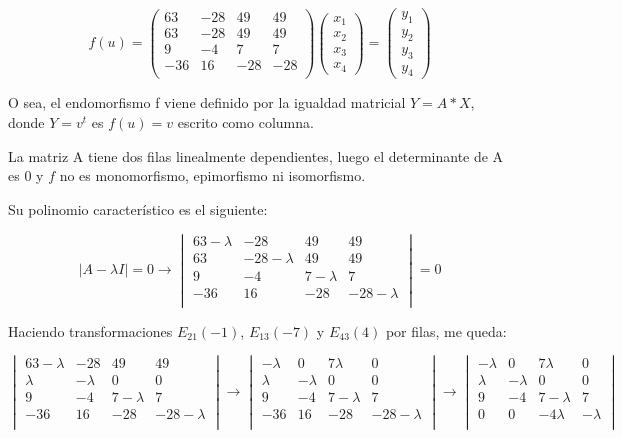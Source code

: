 \documentclass[11pt, a4paper]{article}
\newif\IfInSansMode
\theoremstyle{theorem-style}
\theoremstyle{definition-style}
\theoremstyle{remark-style}
\theoremstyle{example-style}
\begin{document}
$$f(u) = \begin{pmatrix}
63 & -28 & 49 & 49\\
63 & -28 & 49 & 49\\
9 & -4 & 7 & 7\\
-36 & 16 & -28 & -28 \\
\end{pmatrix}\begin{pmatrix}
x_1\\
x_2\\
x_3\\
x_4
\end{pmatrix}=
\begin{pmatrix}
y_1\\
y_2\\
y_3\\
y_4
\end{pmatrix}$$

O sea, el endomorfismo f viene definido por la igualdad matricial $Y=A*X$, donde $Y=v^{t}$ es $f(u)=v$ escrito como columna.

La matriz A tiene dos filas linealmente dependientes, luego el determinante de A es 0 y $f$ no es monomorfismo, epimorfismo ni isomorfismo.

Su polinomio característico es el siguiente:

$$|A-\lambda I| = 0 \rightarrow 
\begin{vmatrix}
63-\lambda & -28 & 49 & 49\\
63 & -28-\lambda & 49 & 49\\
9 & -4 & 7-\lambda & 7\\
-36 & 16 & -28 & -28-\lambda \\
\end{vmatrix} = 0 $$

Haciendo transformaciones $E_{21}(-1)$, $E_{13}(-7)$ y $E_{43}(4)$ por filas, me queda:

$$\begin{vmatrix}
63-\lambda & -28 & 49 & 49\\
\lambda & -\lambda & 0 & 0\\
9 & -4 & 7-\lambda & 7\\
-36 & 16 & -28 & -28-\lambda \\
\end{vmatrix} \rightarrow 
\begin{vmatrix}
-\lambda & 0 & 7\lambda & 0\\
\lambda & -\lambda & 0 & 0\\
9 & -4 & 7-\lambda & 7\\
-36 & 16 & -28 & -28-\lambda \\ 
\end{vmatrix} \rightarrow 
\begin{vmatrix}
-\lambda & 0 & 7\lambda & 0\\
\lambda & -\lambda & 0 & 0\\
9 & -4 & 7-\lambda & 7\\
0 & 0 & -4\lambda & -\lambda \\ 
\end{vmatrix}$$
\end{document}
